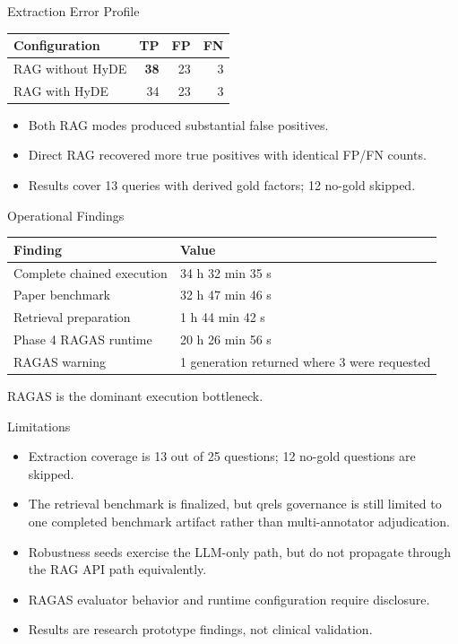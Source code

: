 \documentclass[aspectratio=169,11pt]{beamer}
\begin{document}
\begin{frame}{Extraction Error Profile}
\centering
\small
\begin{tabular}{lrrr}
\toprule
Configuration & TP & FP & FN \\
\midrule
RAG without HyDE & \textbf{38} & 23 & 3 \\
RAG with HyDE & 34 & 23 & 3 \\
\bottomrule
\end{tabular}

\vspace{0.35cm}
\begin{itemize}
  \item Both RAG modes produced substantial false positives.
  \item Direct RAG recovered more true positives with identical FP/FN counts.
  \item Results cover 13 queries with derived gold factors; 12 no-gold skipped.
\end{itemize}
\end{frame}

\begin{frame}{Operational Findings}
\centering
\small
\begin{tabular}{lp{}}
\toprule
Finding & Value \\
\midrule
Complete chained execution & 34 h 32 min 35 s \\
Paper benchmark & 32 h 47 min 46 s \\
Retrieval preparation & 1 h 44 min 42 s \\
Phase 4 RAGAS runtime & 20 h 26 min 56 s \\
RAGAS warning & 1 generation returned where 3 were requested \\
\bottomrule
\end{tabular}

\vspace{0.25cm}
{\small RAGAS is the dominant execution bottleneck.}
\end{frame}

\begin{frame}{Limitations}
\begin{itemize}
  \item Extraction coverage is 13 out of 25 questions; 12 no-gold questions are skipped.
  \item The retrieval benchmark is finalized, but qrels governance is still limited to one completed benchmark artifact rather than multi-annotator adjudication.
  \item Robustness seeds exercise the LLM-only path, but do not propagate through the RAG API path equivalently.
  \item RAGAS evaluator behavior and runtime configuration require disclosure.
  \item Results are research prototype findings, not clinical validation.
\end{itemize}
\end{frame}
\end{document}
